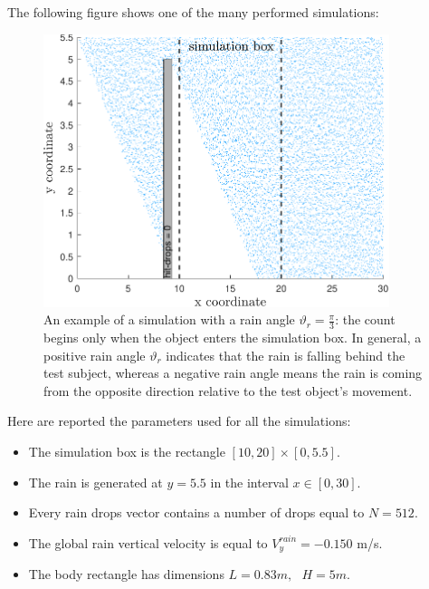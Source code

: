 \documentclass[12pt]{report}
\begin{document}
            \newpage
            The following figure shows one of the many performed simulations:
            \begin{figure}[H]
                \centering
                \includegraphics[width=0.9\textwidth]{images/sim.pdf}
                \caption{An example of a simulation with a rain angle $\vartheta_r = \frac{\pi}{3}$: the count begins only when the object enters the simulation box. In general, a positive rain angle $\vartheta_r$ indicates that the rain is falling behind the test subject, whereas a negative rain angle means the rain is coming from the opposite direction relative to the test object's movement.}
            \end{figure}
            \vspace{-30pt}
            Here are reported the parameters used for all the simulations:
            \begin{itemize}
                \item The simulation box is the rectangle $[10, 20] \times [0, 5.5]$.
                \item The rain is generated at $y = 5.5$ in the interval $x \in [0, 30]$.
                \item Every rain drops vector contains a number of drops equal to $N = 512$.
                \item The global rain vertical velocity is equal to $V^{rain}_y = -0.150$ m/s.
                \item The body rectangle has dimensions $L = 0.83m, \text{ } H = 5m$.
            \end{itemize}

            \newpage
\end{document}
